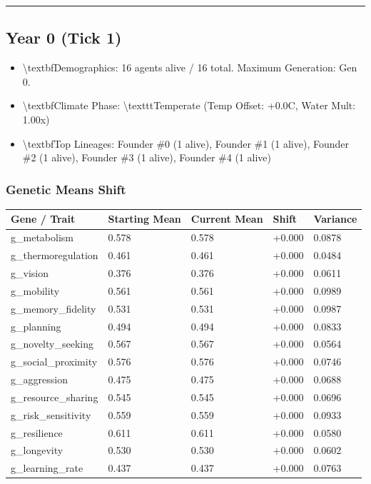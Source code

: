 \documentclass[11pt,a4paper]{article}
\begin{document}
\noindent\rule{\textwidth}{0.4pt}

\subsection*{ Year 0 (Tick 1)}
\begin{itemize}
  \item \textbackslash{}textbf{Demographics:} 16 agents alive / 16 total. Maximum Generation: Gen 0.
  \item \textbackslash{}textbf{Climate Phase:} \textbackslash{}texttt{Temperate} (Temp Offset: +0.0C, Water Mult: 1.00x)
  \item \textbackslash{}textbf{Top Lineages:} Founder \#0 (1 alive), Founder \#1 (1 alive), Founder \#2 (1 alive), Founder \#3 (1 alive), Founder \#4 (1 alive)
\end{itemize}

\subsubsection*{ Genetic Means Shift}
\begin{longtable}{lllll}
\toprule
Gene / Trait & Starting Mean & Current Mean & Shift & Variance \\
\midrule
\endhead
g\_metabolism & 0.578 & 0.578 & +0.000 & 0.0878 \\
g\_thermoregulation & 0.461 & 0.461 & +0.000 & 0.0484 \\
g\_vision & 0.376 & 0.376 & +0.000 & 0.0611 \\
g\_mobility & 0.561 & 0.561 & +0.000 & 0.0989 \\
g\_memory\_fidelity & 0.531 & 0.531 & +0.000 & 0.0987 \\
g\_planning & 0.494 & 0.494 & +0.000 & 0.0833 \\
g\_novelty\_seeking & 0.567 & 0.567 & +0.000 & 0.0564 \\
g\_social\_proximity & 0.576 & 0.576 & +0.000 & 0.0746 \\
g\_aggression & 0.475 & 0.475 & +0.000 & 0.0688 \\
g\_resource\_sharing & 0.545 & 0.545 & +0.000 & 0.0696 \\
g\_risk\_sensitivity & 0.559 & 0.559 & +0.000 & 0.0933 \\
g\_resilience & 0.611 & 0.611 & +0.000 & 0.0580 \\
g\_longevity & 0.530 & 0.530 & +0.000 & 0.0602 \\
g\_learning\_rate & 0.437 & 0.437 & +0.000 & 0.0763 \\
\bottomrule
\end{longtable}
\end{document}
